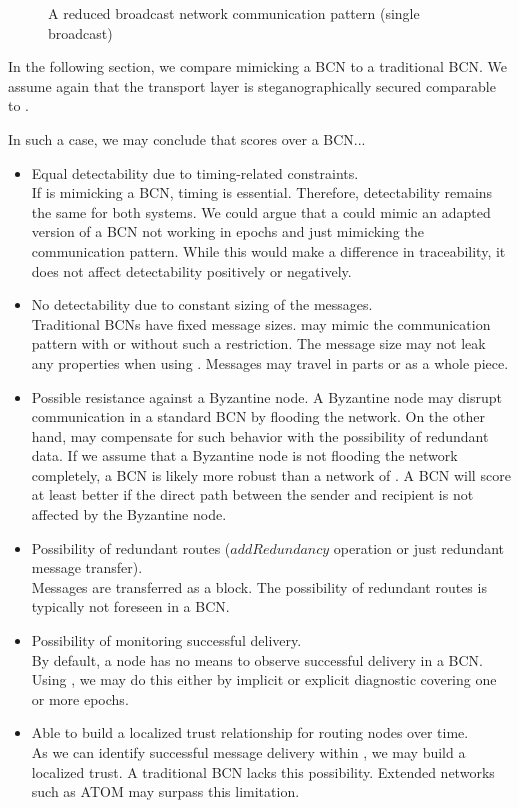 \begin{figure}[ht]\centering
	
	\caption{A reduced broadcast network communication pattern (single broadcast)}
	\label{fig:bcRedCommPattern}
\end{figure}

In the following section, we compare \MessageVortex{} mimicking a BCN to a traditional BCN. We assume again that the transport layer is steganographically secured comparable to \MessageVortex.

In such a case, we may conclude that \MessageVortex{} scores over a BCN...
\begin{itemize}
	\item Equal detectability due to timing-related constraints.\\
	If \MessageVortex{} is mimicking a BCN, timing is essential. Therefore, detectability remains the same for both systems. We could argue that a \MessageVortex{} could mimic an adapted version of a BCN not working in epochs and just mimicking the communication pattern. While this would make a difference in traceability, it does not affect detectability positively or negatively.
	\item No detectability due to constant sizing of the messages.\\
	Traditional BCNs have fixed message sizes. \MessageVortex{} may mimic the communication pattern with or without such a restriction. The message size may not leak any properties when using \MessageVortex{}. Messages may travel in parts or as a whole piece.
	\item Possible resistance against a Byzantine node.
	A Byzantine node may disrupt communication in a standard BCN by flooding the network. On the other hand, \MessageVortex{} may compensate for such behavior with the possibility of redundant data. If we assume that a Byzantine node is not flooding the network completely, a BCN is likely more robust than a network of \VortexNodes{}. A BCN will score at least better if the direct path between the sender and recipient is not affected by the Byzantine node. 
	\item Possibility of redundant routes ($addRedundancy$ operation or just redundant message transfer).\\
	Messages are transferred as a block. The possibility of redundant routes is typically not foreseen in a BCN.
	\item Possibility of monitoring successful delivery.\\
	By default, a node has no means to observe successful delivery in a BCN. Using \MessageVortex{}, we may do this either by implicit or explicit diagnostic covering one or more epochs.
	\item Able to build a localized trust relationship for routing nodes over time.\\
	As we can identify successful message delivery within \MessageVortex{}, we may build a localized trust. A traditional BCN lacks this possibility. Extended networks such as ATOM may surpass this limitation.
\end{itemize}

